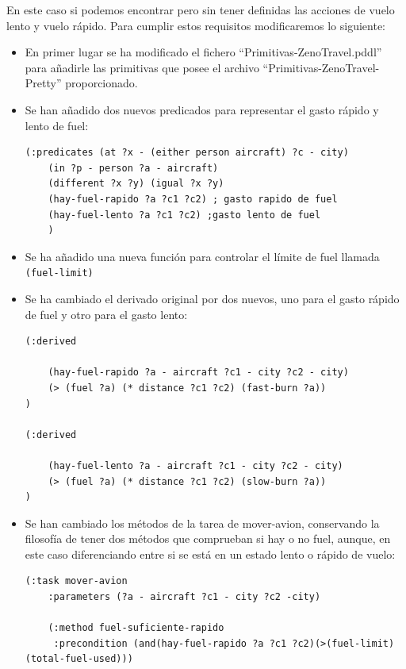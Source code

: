 En este caso si podemos encontrar pero sin tener definidas las acciones de vuelo lento y vuelo rápido. Para cumplir estos requisitos modificaremos lo siguiente:
\newpage
\begin{itemize}
	\item En primer lugar se ha modificado el fichero ``Primitivas-ZenoTravel.pddl'' para añadirle las primitivas que posee el archivo ``Primitivas-ZenoTravel-Pretty'' proporcionado.
	
	\item Se han añadido dos nuevos predicados para representar el gasto rápido y lento de fuel:
	
	\begin{lstlisting}[language=SH]
(:predicates (at ?x - (either person aircraft) ?c - city)
	(in ?p - person ?a - aircraft)
	(different ?x ?y) (igual ?x ?y)
	(hay-fuel-rapido ?a ?c1 ?c2) ; gasto rapido de fuel
	(hay-fuel-lento ?a ?c1 ?c2) ;gasto lento de fuel
	)
	\end{lstlisting}
	
	\item Se ha añadido una nueva función para controlar el límite de fuel llamada \texttt{(fuel-limit)}
	
	\item Se ha cambiado el derivado original por dos nuevos, uno para el gasto rápido de fuel y otro para el gasto lento:
	
	\begin{lstlisting}[language=SH]
(:derived 

	(hay-fuel-rapido ?a - aircraft ?c1 - city ?c2 - city)
	(> (fuel ?a) (* distance ?c1 ?c2) (fast-burn ?a))
)

(:derived 

	(hay-fuel-lento ?a - aircraft ?c1 - city ?c2 - city)
	(> (fuel ?a) (* distance ?c1 ?c2) (slow-burn ?a))
)
	\end{lstlisting}
	
	\item Se han cambiado los métodos de la tarea de mover-avion, conservando la filosofía de tener dos métodos que comprueban si hay o no fuel, aunque, en este caso diferenciando entre si se está en un estado lento o rápido de vuelo:
	
\begin{lstlisting}[language=SH]
(:task mover-avion
	:parameters (?a - aircraft ?c1 - city ?c2 -city)
	
	(:method fuel-suficiente-rapido 
	 :precondition (and(hay-fuel-rapido ?a ?c1 ?c2)(>(fuel-limit)(total-fuel-used)))
	 

\end{lstlisting}
\end{itemize}
